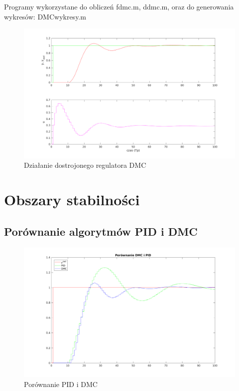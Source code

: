\documentclass[a4paper, 11pt]{article}
\begin{document}
\noindent Programy wykorzystane do obliczeń fdmc.m, ddmc.m, oraz do generowania wykresów: DMCwykresy.m\\


\begin{figure}[H]
\centering
\includegraphics[scale=0.60]{Dostrojony_DmC.png}
\caption{Działanie dostrojonego regulatora DMC}
\end{figure}

\section{Obszary stabilności}
\subsection{Porównanie algorytmów PID i DMC}

\begin{figure}[H]
\centering
\includegraphics[scale=0.60]{PIDiDMC.png}
\caption{Porównanie PID i DMC}
\end{figure}
\end{document}
